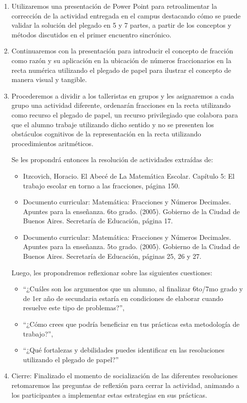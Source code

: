 \begin{enumerate}
	\item Utilizaremos una presentación de Power Point para retroalimentar la corrección de la actividad entregada en el campus destacando cómo se puede validar la solución del plegado en 5 y 7 partes, a partir de los conceptos y métodos discutidos en el primer encuentro sincrónico.
	\item Continuaremos con la presentación para introducir el concepto de fracción como razón y su aplicación en la ubicación de números fraccionarios en la recta numérica utilizando el plegado de papel para ilustrar el concepto de manera visual y tangible.
	\item Procederemos a dividir a los talleristas en grupos y les asignaremos a cada grupo una actividad diferente, ordenarán fracciones en la recta utilizando como recurso el plegado de papel, un recurso privilegiado que colabora para que el alumno trabaje utilizando dicho sentido y no se presenten los obstáculos cognitivos de la representación en la recta utilizando procedimientos aritméticos.
	
	Se les propondrá entonces la resolución de actividades extraídas de:
	\begin{itemize}
		\item Itzcovich, Horacio. El Abecé de La Matemática Escolar. Capítulo 5: El trabajo escolar en torno a las fracciones, página 150.
		\item Documento curricular: Matemática: Fracciones y Números Decimales. Apuntes para la enseñanza. 6to grado. (2005). Gobierno de la Ciudad de Buenos Aires. Secretaría de Educación, página 17.
		\item Documento curricular: Matemática: Fracciones y Números Decimales. Apuntes para la enseñanza. 5to grado. (2005). Gobierno de la Ciudad de Buenos Aires. Secretaría de Educación, páginas 25, 26 y 27.
	\end{itemize}
	
	Luego, les propondremos reflexionar sobre las siguientes cuestiones:
	\begin{itemize}
		\itshape
		\item “¿Cuáles son los argumentos que un alumno, al finalizar 6to/7mo grado y de 1er año de secundaria estaría en condiciones de elaborar cuando resuelve este tipo de problemas?”,
		\item “¿Cómo crees que podría beneficiar en tus prácticas esta metodología de trabajo?”,
		\item “¿Qué fortalezas y debilidades puedes identificar en las resoluciones utilizando el plegado de papel?”
	\end{itemize}
	
	\item Cierre: Finalizado el momento de socialización de las diferentes resoluciones retomaremos las preguntas de reflexión para cerrar la actividad, animando a los participantes a implementar estas estrategias en sus prácticas.
\end{enumerate}

